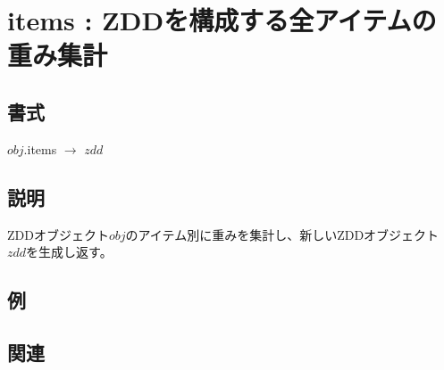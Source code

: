 
\section{items : ZDDを構成する全アイテムの重み集計\label{sect:items }}
\subsection*{書式}
$obj$.items $\rightarrow$ $zdd$

\subsection*{説明}
ZDDオブジェクト$obj$のアイテム別に重みを集計し、新しいZDDオブジェクト$zdd$を生成し返す。

\subsection*{例}


\subsection*{関連}

